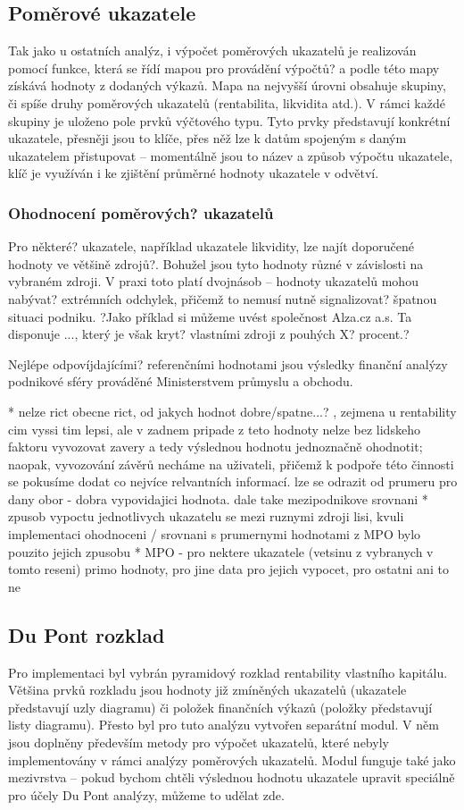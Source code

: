 \subsection{Poměrové ukazatele}
Tak jako u ostatních analýz, i výpočet poměrových ukazatelů je realizován pomocí funkce, která se řídí mapou pro provádění výpočtů? a podle této mapy získává hodnoty z dodaných výkazů. Mapa na nejvyšší úrovni obsahuje skupiny, či spíše druhy poměrových ukazatelů (rentabilita, likvidita atd.). V rámci každé skupiny je uloženo pole prvků výčtového typu. Tyto prvky představují konkrétní ukazatele, přesněji jsou to klíče, přes něž lze k datům spojeným s daným ukazatelem přistupovat -- momentálně jsou to název a způsob výpočtu ukazatele, klíč je využíván i ke zjištění průměrné hodnoty ukazatele v odvětví.


\subsubsection{Ohodnocení poměrových? ukazatelů}
Pro některé? ukazatele, například ukazatele likvidity, lze najít doporučené hodnoty ve většině zdrojů?. Bohužel jsou tyto hodnoty různé v závislosti na vybraném zdroji. V praxi toto platí dvojnásob -- hodnoty ukazatelů mohou nabývat? extrémních odchylek, přičemž to nemusí nutně signalizovat? špatnou situaci podniku. ?Jako příklad si můžeme uvést společnost Alza.cz a.s. Ta disponuje ..., který je však kryt? vlastními zdroji z pouhých X? procent.? 

Nejlépe odpovíjdajícími? referenčními hodnotami jsou výsledky finanční analýzy podnikové sféry prováděné Ministerstvem průmyslu a obchodu. 

* nelze rict obecne rict, od jakych hodnot dobre/spatne...? , zejmena u rentability cim vyssi tim lepsi, ale v zadnem pripade z teto hodnoty nelze bez lidskeho faktoru vyvozovat zavery a tedy výslednou hodnotu jednoznačně ohodnotit; naopak, vyvozování závěrů necháme na uživateli, přičemž k podpoře této činnosti se pokusíme dodat co nejvíce relvantních informací. lze se odrazit od prumeru pro dany obor - dobra vypovidajici hodnota. dale take mezipodnikove srovnani
* zpusob vypoctu jednotlivych ukazatelu se mezi ruznymi zdroji lisi, kvuli implementaci ohodnoceni / srovnani s prumernymi hodnotami z MPO bylo pouzito jejich zpusobu
* MPO - pro nektere ukazatele (vetsinu z vybranych v tomto reseni) primo hodnoty, pro jine data pro jejich vypocet, pro ostatni ani to ne


\subsection{Du Pont rozklad}
Pro implementaci byl vybrán pyramidový rozklad rentability vlastního kapitálu. Většina prvků rozkladu jsou hodnoty již zmíněných ukazatelů (ukazatele představují uzly diagramu) či položek finančních výkazů (položky představují listy diagramu). Přesto byl pro tuto analýzu vytvořen separátní modul. V něm jsou doplněny především metody pro výpočet ukazatelů, které nebyly implementovány v rámci analýzy poměrových ukazatelů. Modul funguje také jako mezivrstva -- pokud bychom chtěli výslednou hodnotu ukazatele upravit speciálně pro účely Du Pont analýzy, můžeme to udělat zde. 

